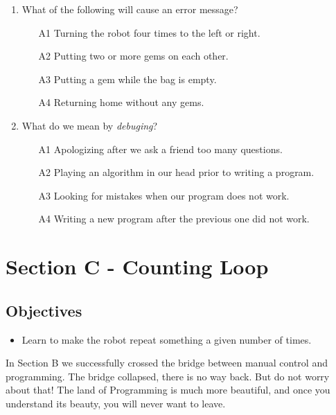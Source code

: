 \documentclass[article,A4,12pt]{llncs}
\begin{document}
{{\begin{enumerate}
\begin{enumerate}
\item[A1] Writing two commands on the same line.
\item[A2] Having two empty characters between commands.
\item[A3] Mis-spelling a command.  
\item[A4] Mistake that causes the robot to do something unexpected.
\end{enumerate}
\item What of the following will cause an error message?
\begin{enumerate}
\item[A1] Turning the robot four times to the left or right.
\item[A2] Putting two or more gems on each other.
\item[A3] Putting a gem while the bag is empty.
\item[A4] Returning home without any gems.
\end{enumerate}
\item What do we mean by {\em debuging}?
\begin{enumerate}
\item[A1] Apologizing after we ask a friend too many questions.
\item[A2] Playing an algorithm in our head prior to writing a program. 
\item[A3] Looking for mistakes when our program does not work.
\item[A4] Writing a new program after the previous one did not work.
\end{enumerate}
\end{enumerate}

\section{Section C - Counting Loop}

\subsection{Objectives} 

\begin{itemize}
\item Learn to make the robot repeat something a given number of times.
\end{itemize}

\noindent
In Section B we successfully crossed the bridge between manual control 
and programming. The bridge collapsed, there is no way back. But do 
not worry about that! The land of Programming is much more beautiful,
and once you understand its beauty, you will never want to leave.


}}
\end{document}
